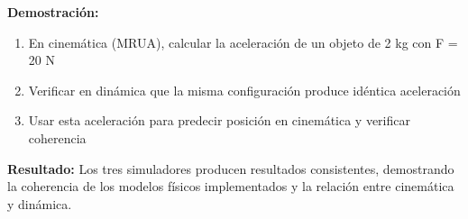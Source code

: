 \textbf{Demostración:}
\begin{enumerate}
    \item En cinemática (MRUA), calcular la aceleración de un objeto de 2 kg con F = 20 N
    \item Verificar en dinámica que la misma configuración produce idéntica aceleración
    \item Usar esta aceleración para predecir posición en cinemática y verificar coherencia
\end{enumerate}

\textbf{Resultado:} Los tres simuladores producen resultados consistentes, demostrando la coherencia de los modelos físicos implementados y la relación entre cinemática y dinámica.